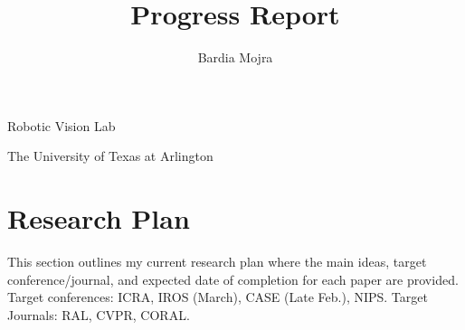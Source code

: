 \documentclass[11pt]{article}
\title{Progress Report}
\author{Bardia Mojra}
\begin{document}
\maketitle
\thispagestyle{empty}

\bigskip
\bigskip
\begin{center}
 Robotic Vision Lab
\end{center}

\begin{center}
The University of Texas at Arlington
\end{center}

\newpage

\section{Research Plan}
This section outlines my current research plan where the main ideas, target
conference/journal, and expected date of completion for each paper
are provided.
Target conferences: ICRA, IROS (March), CASE (Late Feb.), NIPS.
Target Journals: RAL, CVPR, CORAL.
\end{document}
